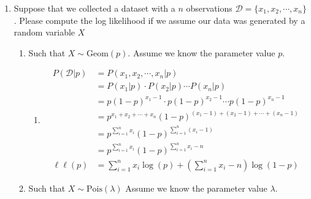 \documentclass[krantz1,ChapterTOCs]{krantz}
\begin{document}
\begin{enumerate}
\begin{enumerate}
    \end{enumerate}
    
    \item Suppose that we collected a dataset with a $n$ observations $\mathcal{D} = \{ x_{1}, x_{2}, \cdots, x_{n} \}$. Please compute the log likelihood if we assume our data was generated by a random variable $X$
        \begin{enumerate}
        \item Such that $X \sim \text{Geom}(p)$. Assume we know the parameter value $p$.
        
        \begin{enumerate}
            \item {\color{red} 
                \begin{align*}
                    P(\mathcal{D} | p) &= P(x_{1},x_{2},\cdots,x_{n} | p)\\
                    &= P(x_{1}|p) \cdot P(x_{2}|p) \cdots P(x_{n}|p)\\
                    &= p(1-p)^{x_{1}-1} \cdot p(1-p)^{x_{2}-1} \cdots p(1-p)^{x_{n}-1} \\ 
                    &= p^{x_{1}+x_{2}+\cdots+x_{n}} (1-p)^{ (x_{1}-1) + (x_{2}-1) + \cdots + (x_{n}-1) } \\ 
                    &= p^{ \sum_{i=1}^{n} x_{i} } (1-p)^{ \sum_{i=1}^{n} (x_{i}-1) } \\ 
                    &= p^{ \sum_{i=1}^{n} x_{i} } (1-p)^{ \sum_{i=1}^{n} x_{i} - n } \\
                    \ell \ell (p) &= \sum_{i=1}^{n} x_{i} \log(p) + \left(\sum_{i=1}^{n} x_{i} - n\right) \log(1-p) 
                \end{align*}
            }
        \end{enumerate}
    
        \item Such that $X \sim \text{Pois}(\lambda)$ Assume we know the parameter value $\lambda$.
        

\end{enumerate}
\end{enumerate}
\end{document}
